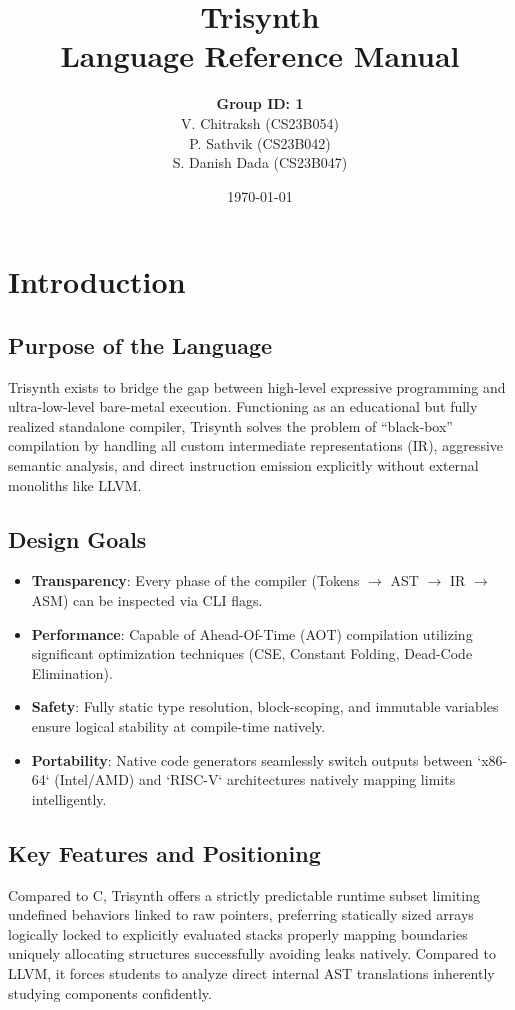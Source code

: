 \documentclass[12pt,a4paper]{article}
\title{\Huge \textbf{Trisynth}\\
\vspace{0.5cm}
\Large Language Reference Manual}
\author{
\textbf{Group ID: 1}\\
V. Chitraksh (CS23B054)\\
P. Sathvik (CS23B042)\\
S. Danish Dada (CS23B047)
}
\date{\today}
\begin{document}
\maketitle
\newpage

\tableofcontents
\newpage

\section{Introduction}

\subsection{Purpose of the Language}
Trisynth exists to bridge the gap between high-level expressive programming and ultra-low-level bare-metal execution. Functioning as an educational but fully realized standalone compiler, Trisynth solves the problem of ``black-box'' compilation by handling all custom intermediate representations (IR), aggressive semantic analysis, and direct instruction emission explicitly without external monoliths like LLVM.

\subsection{Design Goals}
\begin{itemize}
    \item \textbf{Transparency}: Every phase of the compiler (Tokens $\rightarrow$ AST $\rightarrow$ IR $\rightarrow$ ASM) can be inspected via CLI flags.
    \item \textbf{Performance}: Capable of Ahead-Of-Time (AOT) compilation utilizing significant optimization techniques (CSE, Constant Folding, Dead-Code Elimination).
    \item \textbf{Safety}: Fully static type resolution, block-scoping, and immutable variables ensure logical stability at compile-time natively.
    \item \textbf{Portability}: Native code generators seamlessly switch outputs between `x86-64` (Intel/AMD) and `RISC-V` architectures natively mapping limits intelligently.
\end{itemize}

\subsection{Key Features and Positioning}
Compared to C, Trisynth offers a strictly predictable runtime subset limiting undefined behaviors linked to raw pointers, preferring statically sized arrays logically locked to explicitly evaluated stacks properly mapping boundaries uniquely allocating structures successfully avoiding leaks natively. Compared to LLVM, it forces students to analyze direct internal AST translations inherently studying components confidently.
\end{document}

